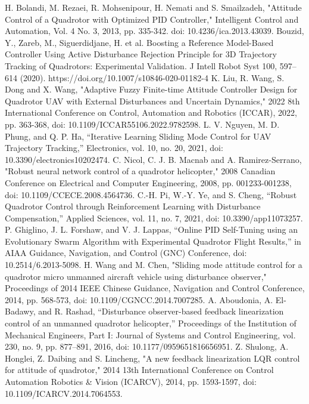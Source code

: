 \documentclass[conference]{IEEEtran}
\begin{document}
\begin{thebibliography}{00}
 H. Bolandi, M. Rezaei, R. Mohsenipour, H. Nemati and S. Smailzadeh, "Attitude Control of a Quadrotor with Optimized PID Controller," Intelligent Control and Automation, Vol. 4 No. 3, 2013, pp. 335-342. doi: 10.4236/ica.2013.43039.
 Bouzid, Y., Zareb, M., Siguerdidjane, H. et al. Boosting a Reference Model-Based Controller Using Active Disturbance Rejection Principle for 3D Trajectory Tracking of Quadrotors: Experimental Validation. J Intell Robot Syst 100, 597–614 (2020). https://doi.org/10.1007/s10846-020-01182-4
 K. Liu, R. Wang, S. Dong and X. Wang, "Adaptive Fuzzy Finite-time Attitude Controller Design for Quadrotor UAV with External Disturbances and Uncertain Dynamics," 2022 8th International Conference on Control, Automation and Robotics (ICCAR), 2022, pp. 363-368, doi: 10.1109/ICCAR55106.2022.9782598.
 L. V. Nguyen, M. D. Phung, and Q. P. Ha, “Iterative Learning Sliding Mode Control for UAV Trajectory Tracking,” Electronics, vol. 10, no. 20, 2021, doi: 10.3390/electronics10202474.
 C. Nicol, C. J. B. Macnab and A. Ramirez-Serrano, "Robust neural network control of a quadrotor helicopter," 2008 Canadian Conference on Electrical and Computer Engineering, 2008, pp. 001233-001238, doi: 10.1109/CCECE.2008.4564736.
 C.-H. Pi, W.-Y. Ye, and S. Cheng, “Robust Quadrotor Control through Reinforcement Learning with Disturbance Compensation,” Applied Sciences, vol. 11, no. 7, 2021, doi: 10.3390/app11073257.
 P. Ghiglino, J. L. Forshaw, and V. J. Lappas, “Online PID Self-Tuning using an Evolutionary Swarm Algorithm with Experimental Quadrotor Flight Results,” in AIAA Guidance, Navigation, and Control (GNC) Conference, doi: 10.2514/6.2013-5098.
 H. Wang and M. Chen, "Sliding mode attitude control for a quadrotor micro unmanned aircraft vehicle using disturbance observer," Proceedings of 2014 IEEE Chinese Guidance, Navigation and Control Conference, 2014, pp. 568-573, doi: 10.1109/CGNCC.2014.7007285.
 A. Aboudonia, A. El-Badawy, and R. Rashad, “Disturbance observer-based feedback linearization control of an unmanned quadrotor helicopter,” Proceedings of the Institution of Mechanical Engineers, Part I: Journal of Systems and Control Engineering, vol. 230, no. 9, pp. 877–891, 2016, doi: 10.1177/0959651816656951.
 Z. Shulong, A. Honglei, Z. Daibing and S. Lincheng, "A new feedback linearization LQR control for attitude of quadrotor," 2014 13th International Conference on Control Automation Robotics \& Vision (ICARCV), 2014, pp. 1593-1597, doi: 10.1109/ICARCV.2014.7064553.

\end{thebibliography}
\end{document}

